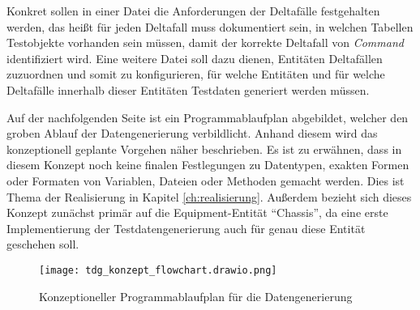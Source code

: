 Konkret sollen in einer Datei die Anforderungen der Deltafälle festgehalten werden, das heißt für jeden Deltafall muss dokumentiert sein, in welchen Tabellen Testobjekte vorhanden sein müssen, damit der korrekte Deltafall von \textit{Command} identifiziert wird. Eine weitere Datei soll dazu dienen, Entitäten Deltafällen zuzuordnen und somit zu konfigurieren, für welche Entitäten und für welche Deltafälle innerhalb dieser Entitäten Testdaten generiert werden müssen.

Auf der nachfolgenden Seite ist ein Programmablaufplan abgebildet, welcher den groben Ablauf der Datengenerierung verbildlicht. Anhand diesem wird das konzeptionell geplante Vorgehen näher beschrieben. Es ist zu erwähnen, dass in diesem Konzept noch keine finalen Festlegungen zu Datentypen, exakten Formen oder Formaten von Variablen, Dateien oder Methoden gemacht werden. Dies ist Thema der Realisierung in Kapitel \ref{ch:realisierung}. Außerdem bezieht sich dieses Konzept zunächst primär auf die Equipment-Entität \enquote{Chassis}, da eine erste Implementierung der Testdatengenerierung auch für genau diese Entität geschehen soll.

\begin{figure}[htp]
    \centering
    \texttt{[image: tdg\_konzept\_flowchart.drawio.png]}
    \caption{Konzeptioneller Programmablaufplan für die Datengenerierung\footnotemark}
\end{figure}

